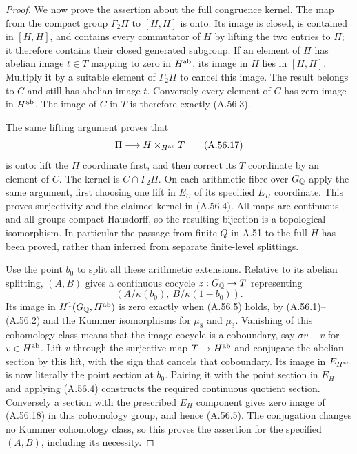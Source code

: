 \begin{proof}
We now prove the assertion about the full congruence kernel.
The map from the compact group $\Gamma_2\Pi$ to $[H,H]$
is onto.  Its image is closed, is contained in $[H,H]$,
and contains every commutator of $H$ by lifting the two
entries to $\Pi$; it therefore contains their closed
generated subgroup.  If an element of $\Pi$ has abelian
image $t\in T$ mapping to zero in $H^{\rm ab}$, its image
in $H$ lies in $[H,H]$.  Multiply it by a suitable element
of $\Gamma_2\Pi$ to cancel this image.  The result belongs
to $C$ and still has abelian image $t$.  Conversely every
element of $C$ has zero image in $H^{\rm ab}$.
The image of $C$ in $T$ is therefore exactly (A.56.3).

The same lifting argument proves that
\[
                \Pi\longrightarrow H\times_{H^{\rm ab}}T
\tag{A.56.17}
\]
is onto: lift the $H$ coordinate first, and then correct
its $T$ coordinate by an element of $C$.  The kernel is
$C\cap\Gamma_2\Pi$.  On each arithmetic fibre over
$G_\mathbb Q$ apply the same argument, first choosing one lift
in $E_U$ of its specified $E_H$ coordinate.
This proves surjectivity and the claimed kernel in
(A.56.4).  All maps are continuous and all groups compact
Hausdorff, so the resulting bijection is a topological
isomorphism.  In particular the passage from finite $Q$
in A.51 to the full $H$ has been proved, rather than
inferred from separate finite-level splittings.

Use the point $b_0$ to split all these arithmetic
extensions.  Relative to its abelian splitting, $(A,B)$
gives a continuous cocycle $z:G_\mathbb Q\to T$ representing
\[
               (A/\kappa(b_0),\ B/\kappa(1-b_0)).
\tag{A.56.18}
\]
Its image in $H^1(G_\mathbb Q,H^{\rm ab})$ is zero exactly when
(A.56.5) holds, by (A.56.1)--(A.56.2) and the Kummer
isomorphisms for $\mu_8$ and $\mu_3$.
Vanishing of this cohomology class means that the image
cocycle is a coboundary, say $\sigma v-v$ for
$v\in H^{\rm ab}$.  Lift $v$ through the surjective
map $T\to H^{\rm ab}$ and conjugate the abelian section
by this lift, with the sign that cancels that coboundary.
Its image in $E_{H^{\rm ab}}$ is now literally the point
section at $b_0$.  Pairing it with the point section in
$E_H$ and applying (A.56.4) constructs the required
continuous quotient section.  Conversely a section
with the prescribed $E_H$ component gives zero image
of (A.56.18) in this cohomology group, and hence
(A.56.5).  The conjugation changes no Kummer cohomology
class, so this proves the assertion for the specified
$(A,B)$, including its necessity.


\end{proof}
